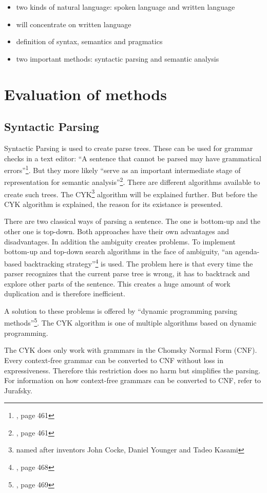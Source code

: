 \documentclass[12pt,twoside]{scrartcl}
\theoremstyle{plain}
\theoremstyle{definition}
\theoremstyle{remark}
\begin{document}
	\begin{itemize}
		\item	two kinds of natural language: spoken language and written language
		\item	will concentrate on written language
		\item	definition of syntax, semantics and pragmatics
		\item	two important methods: syntactic parsing and semantic analysis
	\end{itemize}

\section{Evaluation of methods}
\label{sec:evalMethods}
	\subsection{Syntactic Parsing}
	\label{subSec:syntacticParsing}
		Syntactic Parsing is used to create parse trees. These can be used for grammar checks in a text editor: ``A sentence that cannot be parsed may have grammatical errors''\footnote{\cite{Jurafsky2009b}, page 461}. But they more likely ``serve as an important intermediate stage of representation for semantic analysis''\footnote{\cite{Jurafsky2009b}, page 461}. There are different algorithms available to create such trees. The CYK\footnote{named after inventors John Cocke, Daniel Younger and Tadeo Kasami} algorithm will be explained further. But before the CYK algorithm is explained, the reason for its existance is presented.
		
		There are two classical ways of parsing a sentence. The one is bottom-up and the other one is top-down. Both approaches have their own advantages and disadvantages. In addition the ambiguity creates problems. To implement bottom-up and top-down search algorithms in the face of ambiguity, ``an agenda-based backtracking strategy''\footnote{\cite{Jurafsky2009b}, page 468} is used. The problem here is that every time the parser recognizes that the current parse tree is wrong, it has to backtrack and explore other parts of the sentence. This creates a huge amount of work duplication and is therefore inefficient.
		
		A solution to these problems is offered by ``dynamic programming parsing methods''\footnote{\cite{Jurafsky2009b}, page 469}. The CYK algorithm is one of multiple algorithms based on dynamic programming.
		
		The CYK does only work with grammars in the Chomsky Normal Form (CNF). Every context-free grammar can be converted to CNF without loss in expressiveness. Therefore this restriction does no harm but simplifies the parsing. For information on how context-free grammars can be converted to CNF, refer to Jurafsky\cite{Jurafsky2009b}.
		
\end{document}
